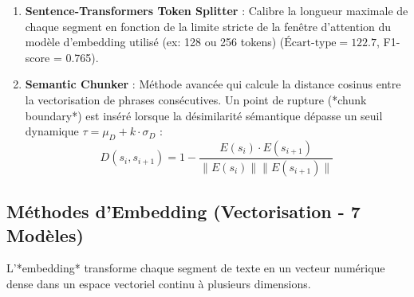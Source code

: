 \documentclass[12pt,a4paper,oneside]{report}
\begin{document}
\begin{enumerate}
    \item \textbf{Sentence-Transformers Token Splitter} : Calibre la longueur maximale de chaque segment en fonction de la limite stricte de la fenêtre d'attention du modèle d'embedding utilisé (ex: 128 ou 256 tokens) ($\text{Écart-type} = 122.7$, F1-score = 0.765).
    \item \textbf{Semantic Chunker} : Méthode avancée qui calcule la distance cosinus entre la vectorisation de phrases consécutives. Un point de rupture (*chunk boundary*) est inséré lorsque la désimilarité sémantique dépasse un seuil dynamique $\tau = \mu_D + k \cdot \sigma_D$ :
    \begin{equation}
    D(s_i, s_{i+1}) = 1 - \frac{E(s_i) \cdot E(s_{i+1})}{\|E(s_i)\| \|E(s_{i+1})\|}
    \end{equation}
\end{enumerate}

\subsection{Méthodes d'Embedding (Vectorisation - 7 Modèles)}
L'*embedding* transforme chaque segment de texte en un vecteur numérique dense dans un espace vectoriel continu à plusieurs dimensions.
\end{document}
